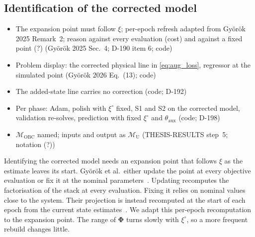 \subsection{Identification of the corrected model}\label{sec:obc_id}
\ifdraft
\begin{itemize}
\item The expansion point must follow $\xi$; per-epoch refresh adapted from Gy\"or\"ok 2025 Remark~2; reason against every evaluation (cost) and against a fixed point (?) (Gy\"or\"ok 2025 Sec.~4; D-190 item 6; code)
\item Problem display: the corrected physical line in \eqref{eq:aug_loss}, regressor at the simulated point (Gy\"or\"ok 2026 Eq.~(13); code)
\item The added-state line carries no correction (code; D-192)
\item Per phase: Adam, polish with $\xi^\circ$ fixed, S1 and S2 on the corrected model, validation re-solves, prediction with fixed $\xi^\circ$ and $\theta_{\mathrm{aux}}$ (code; D-198)
\item $\mathcal M_{\mathrm{OBC}}$ named; inputs and output as $\mathcal M_{\mathrm U}$ (THESIS-RESULTS step~5; notation (?))
\end{itemize}
\fi

Identifying the corrected model needs an expansion point that follows $\xi$
as the estimate leaves its start.
Gy\"or\"ok et al.\ either update the point at every objective evaluation or fix
it at the nominal parameters~\cite[Sec.~4]{gyorok2025l4dc}.
Updating recomputes the factorisation of the stack at every evaluation.
Fixing it relies on nominal values close to the system.
Their projection is instead recomputed at the start of each epoch from the
current state estimates~\cite[Remark~2]{gyorok2025l4dc}.
We adapt this per-epoch recomputation to the expansion point.
The range of $\boldsymbol\Phi$ turns slowly with $\xi^\circ$, so a more
frequent rebuild changes little.


